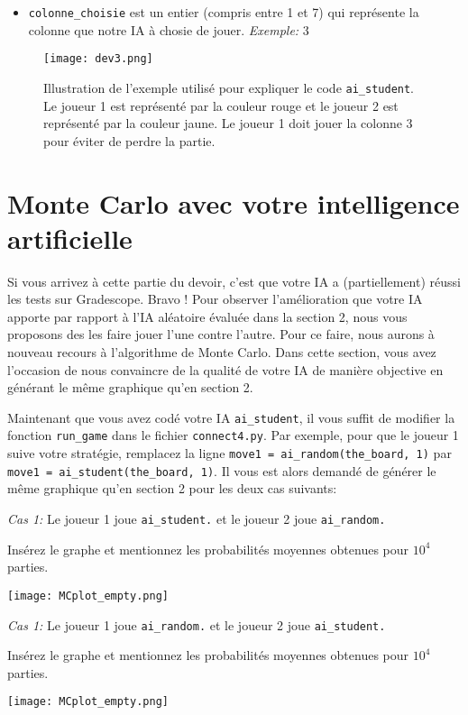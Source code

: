 \documentclass[11pt,answers]{exam}
\begin{document}
\begin{itemize}
	\item \texttt{colonne\_choisie} est un entier (compris entre 1 et 7) qui représente la colonne que notre IA à chosie de jouer. \emph{Exemple:} 3
\end{itemize}

\bigskip

\begin{figure}[!h]
	\centering
	\texttt{[image: dev3.png]}
 	\caption{Illustration de l'exemple utilisé pour expliquer le code \texttt{ai\_student}. Le joueur 1 est représenté par la couleur rouge et le joueur 2 est représenté par la couleur jaune. Le joueur 1 doit jouer la colonne 3 pour éviter de perdre la partie.}
	\label{fig:ex_sec3}
\end{figure}

\newpage

\section{Monte Carlo avec votre intelligence artificielle}

Si vous arrivez à cette partie du devoir, c'est que votre IA a (partiellement) réussi les tests sur Gradescope. Bravo ! Pour observer l'amélioration que votre IA apporte par rapport à l'IA aléatoire évaluée dans la section 2, nous vous proposons des les faire jouer l'une contre l'autre. Pour ce faire, nous aurons à nouveau recours à l'algorithme de Monte Carlo. Dans cette section, vous avez l'occasion de nous convaincre de la qualité de votre IA de manière objective en générant le même graphique qu'en section 2.

\bigskip

Maintenant que vous avez codé votre IA \texttt{ai\_student}, il vous suffit de modifier la fonction \texttt{run\_game} dans le fichier \texttt{connect4.py}. Par exemple, pour que le joueur 1 suive votre stratégie, remplacez la ligne \texttt{move1 = ai\_random(the\_board, 1)} par \texttt{move1 = ai\_student(the\_board, 1)}. Il vous est alors demandé de générer le même graphique qu'en section 2 pour les deux cas suivants:

\newpage

\emph{Cas 1:} Le joueur 1 joue \texttt{ai\_student.} et le joueur 2 joue \texttt{ai\_random.}

\begin{solutionbox}{100mm}
Insérez le graphe et mentionnez les probabilités moyennes obtenues pour $10^4$ parties.

\centering
\texttt{[image: MCplot\_empty.png]}
\end{solutionbox}

\medskip

\emph{Cas 1:} Le joueur 1 joue \texttt{ai\_random.} et le joueur 2 joue \texttt{ai\_student.}

\begin{solutionbox}{100mm}
Insérez le graphe et mentionnez les probabilités moyennes obtenues pour $10^4$ parties.

\centering
\texttt{[image: MCplot\_empty.png]}
\end{solutionbox}
\end{document}
